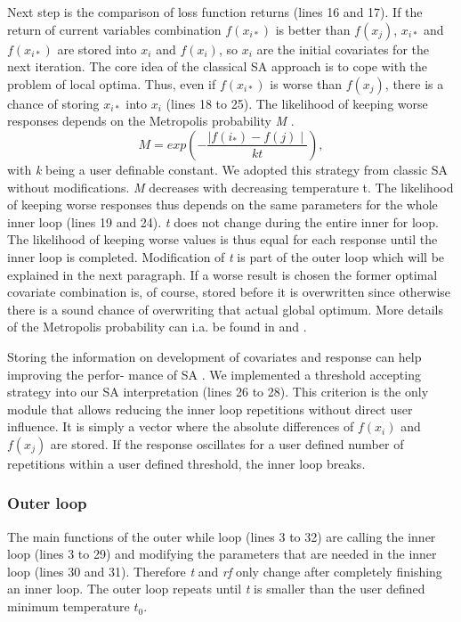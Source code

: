Next step is the comparison of loss function returns (lines 16 and 17). If the return of current variables combination $f(x_{i*})$ is better than $f(x_j)$, $x_{i*}$ and $f(x_{i*})$ are stored into $x_{i}$ and $f(x_{i})$, so $x_{i}$  are the initial covariates for the next iteration. The core idea of the classical SA approach is to cope with the problem of local optima. Thus, even if $f(x_{i*})$ is worse than $f(x_{j})$, there is a chance of storing $x_{i*}$ into $x_i$ (lines 18 to 25). The likelihood of keeping worse responses depends on the Metropolis probability \textit{M} \citep{metropolis_1953}.
\begin{equation}
\label{eq:eq1}
M = exp \left(-\frac{\mid f(i_*)-f(j)\mid}{kt}\right),
\end{equation}
with \textit{k} being a user definable constant. We adopted this strategy from classic SA without modifications. \textit{M} decreases with decreasing temperature t. The likelihood of keeping worse responses thus depends on the same parameters for the whole inner loop (lines 19 and 24). \textit{t} does not change during the entire inner for loop. The likelihood of keeping worse values is thus equal for each response until the inner loop is completed. Modification of \textit{t} is part of the outer loop which will be explained in the next paragraph.  If a worse result is chosen the former optimal covariate combination is, of course, stored before it is overwritten since otherwise there is a sound chance of overwriting that actual global optimum. More details of the Metropolis probability can i.a. be found in \citet{kirkpatrick_1983} and \citet{metropolis_1953}.

Storing the information on development of covariates and response can help improving the perfor- mance of SA \citep{lin_1995, hansen_2012}. We implemented a threshold accepting strategy \citep{dueck_1990} into our SA interpretation (lines 26 to 28). This criterion is the only module that allows reducing the inner loop repetitions without direct user influence. It is simply a vector where the absolute differences of $f(x_{i})$ and $f(x_j)$ are stored. If the response oscillates for a user defined number of repetitions within a user defined threshold, the inner loop breaks.

\subsubsection{Outer loop}
The main functions of the outer while loop (lines 3 to 32) are calling the inner loop (lines 3 to 29) and modifying the parameters that are needed in the inner loop (lines 30 and 31). Therefore \textit{t} and \textit{rf} only change after completely finishing an inner loop. The outer loop repeats until \textit{t} is smaller than the user defined minimum temperature $t_0$.

